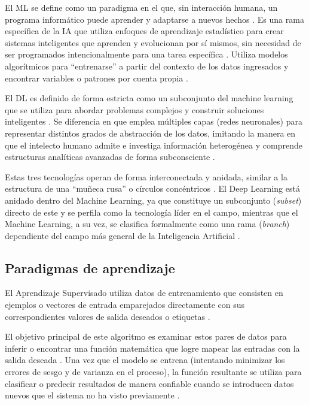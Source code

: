 El ML se define como un paradigma en el que, sin interacción humana, un programa informático puede aprender y adaptarse a nuevos hechos \parencite{GandhiGandhi2022}. Es una rama específica de la IA que utiliza enfoques de aprendizaje estadístico para crear sistemas inteligentes que aprenden y evolucionan por sí mismos, sin necesidad de ser programados intencionalmente para una tarea específica \parencite{GandhiGandhi2022}. Utiliza modelos algorítmicos para \enquote{entrenarse} a partir del contexto de los datos ingresados y encontrar variables o patrones por cuenta propia \parencite{GandhiGandhi2022}.

El DL es definido de forma estricta como un subconjunto del machine learning que se utiliza para abordar problemas complejos y construir soluciones inteligentes \parencite{GandhiGandhi2022}. Se diferencia en que emplea múltiples capas (redes neuronales) para representar distintos grados de abstracción de los datos, imitando la manera en que el intelecto humano admite e investiga información heterogénea y comprende estructuras analíticas avanzadas de forma subconsciente \parencite{GandhiGandhi2022}.

Estas tres tecnologías operan de forma interconectada y anidada, similar a la estructura de una \enquote{muñeca rusa} o círculos concéntricos \parencite{GandhiGandhi2022}. El Deep Learning está anidado dentro del Machine Learning, ya que constituye un subconjunto (\emph{subset}) directo de este y se perfila como la tecnología líder en el campo, mientras que el Machine Learning, a su vez, se clasifica formalmente como una rama (\emph{branch}) dependiente del campo más general de la Inteligencia Artificial \parencite{GandhiGandhi2022}.

\subsection{Paradigmas de aprendizaje}\label{subsec:paradigmas_aprendizaje}

El Aprendizaje Supervisado utiliza datos de entrenamiento que consisten en ejemplos o vectores de entrada emparejados directamente con sus correspondientes valores de salida deseados o etiquetas \parencite{GandhiGandhi2022, VerbrakkenEtAl2020}.

El objetivo principal de este algoritmo es examinar estos pares de datos para inferir o encontrar una función matemática que logre mapear las entradas con la salida deseada \parencite{GandhiGandhi2022, VerbrakkenEtAl2020}. Una vez que el modelo se entrena (intentando minimizar los errores de sesgo y de varianza en el proceso), la función resultante se utiliza para clasificar o predecir resultados de manera confiable cuando se introducen datos nuevos que el sistema no ha visto previamente \parencite{GandhiGandhi2022, VerbrakkenEtAl2020}.

